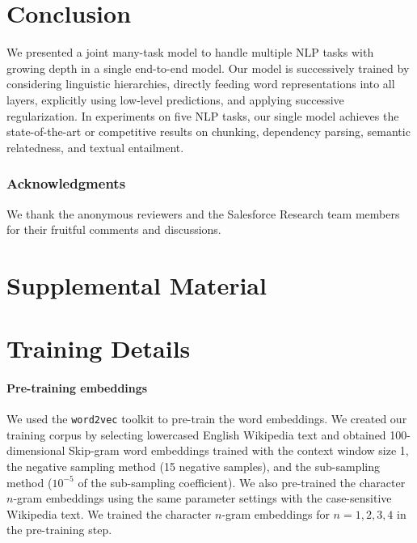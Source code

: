 \documentclass[11pt,a4paper]{article}
\begin{document}
\section{Conclusion}
We presented a joint many-task model to handle multiple NLP tasks with growing depth in a single end-to-end model.
Our model is successively trained by considering linguistic hierarchies, directly feeding word representations into all layers, explicitly using low-level predictions, and applying successive regularization.
In experiments on five NLP tasks, our single model achieves the state-of-the-art or competitive results on chunking, dependency parsing, semantic relatedness, and textual entailment.

\subsubsection*{Acknowledgments}
We thank the anonymous reviewers and the Salesforce Research team members for their fruitful comments and discussions.






\appendix



\section*{Supplemental Material}


\section{Training Details}

\paragraph{Pre-training embeddings}
We used the {\tt word2vec} toolkit to pre-train the word embeddings.
We created our training corpus by selecting lowercased English Wikipedia text and obtained 100-dimensional Skip-gram word embeddings trained with the context window size 1, the negative sampling method (15 negative samples), and the sub-sampling method ($10^{-5}$ of the sub-sampling coefficient).
We also pre-trained the character $n$-gram embeddings using the same parameter settings with the case-sensitive Wikipedia text.
We trained the character $n$-gram embeddings for $n=1, 2, 3, 4$ in the pre-training step.
\end{document}

